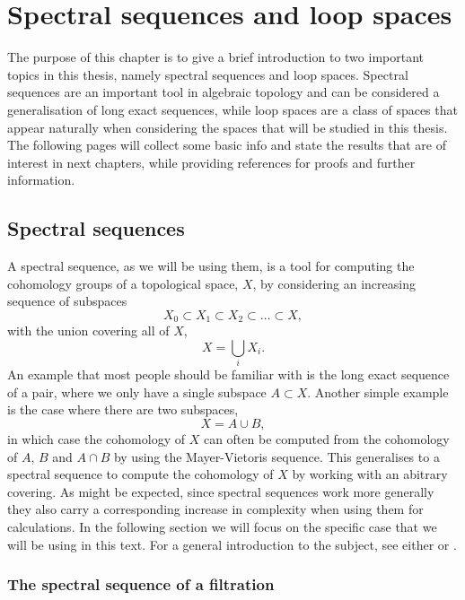 
\chapter{Spectral sequences and loop spaces}

The purpose of this chapter is to give a brief introduction to two
important topics in this thesis, namely spectral sequences and loop
spaces. Spectral sequences are an important tool in algebraic topology
and can be considered a generalisation of long exact sequences, while
loop spaces are a class of spaces that appear naturally when
considering the spaces that will be studied in this thesis. The
following pages will collect some basic info and state the results
that are of interest in next chapters, while providing references for
proofs and further information. 

\section{Spectral sequences}
\label{sec:ss}

A spectral sequence, as we will be using them, is a tool for computing
the cohomology groups of a topological space, $X$, by considering an
increasing sequence of subspaces
\[ X_0 \subset X_1 \subset X_2 \subset \dots \subset X, \]
with the union covering all of $X$,
\[ X = \bigcup_{i} X_i. \]
An example that most people should be familiar with is the long exact
sequence of a pair, where
we only have a single subspace $A \subset X$. Another simple example
is the case where there are two subspaces,
\[ X = A \cup B, \]
in which case the cohomology of $X$ can often be computed from the
cohomology of $A$, $B$ and $A\cap B$ by using the Mayer-Vietoris
sequence. This generalises to a spectral sequence to compute
the cohomology of $X$ by working with an abitrary covering. As might
be expected, since spectral sequences work more generally they also
carry a corresponding increase in complexity when using them for
calculations. In the following section we will focus on the specific
case that 
we will be using in this text. For a general introduction to the
subject, see either \cite{hatcherss} or \cite{mccleary}.

\subsection{The spectral sequence of a filtration}
\label{sec:ss-filtration}

